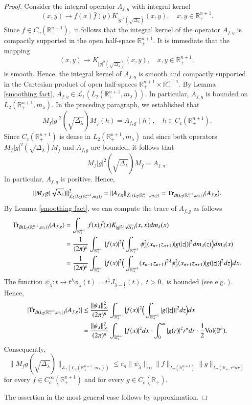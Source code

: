 \documentclass[12pt]{amsart}
\begin{document}
\begin{proof}
{Consider the integral operator $A_{f,g}$ with integral kernel
$$(x,y)\to f(x)\bar{f}(y)K_{|g|^2(\sqrt{\Delta_{\lambda}})}(x,y),\quad x,y\in\mathbb{R}^{n+1}_+.$$
Since $f\in C_c(\mathbb{R}^{n+1}_+),$ it follows that the integral kernel of the operator $A_{f,g}$ is compactly supported in the open half-space $\mathbb{R}^{n+1}_+.$ It is immediate that the mapping
$$(x,y)\to K_{|g|^2(\sqrt{\Delta_{\lambda}})}(x,y),\quad x,y\in\mathbb{R}^{n+1}_+,$$
is smooth. Hence, the integral kernel of $A_{f,g}$ is smooth and compactly supported in the Cartesian product of open half-spaces $\mathbb{R}^{n+1}_+\times\mathbb{R}^{n+1}_+.$ By Lemma \ref{smoothing fact}, $A_{f,g}\in\mathcal{L}_1(L_2(\mathbb{R}^{n+1}_+,m_{\lambda})).$ In particular, $A_{f,g}$ is bounded on $L_2(\mathbb{R}^{n+1}_+,m_{\lambda}).$ In the preceding paragraph, we established that
$$M_f|g|^2(\sqrt{\Delta_{\lambda}})M_{\bar{f}}(h)=A_{f,g}(h),\quad h\in C_c(\mathbb{R}_+^{n+1}).$$
Since $C_c(\mathbb{R}_+^{n+1})$ is dense in $L_2(\mathbb{R}^{n+1}_+,m_{\lambda})$ and since both operators $M_f|g|^2(\sqrt{\Delta_{\lambda}})M_{\bar{f}}$ and $A_{f,g}$ are bounded, it follows that
$$M_f|g|^2(\sqrt{\Delta_{\lambda}})M_{\bar{f}}=A_{f,g}.$$
In particular, $A_{f,g}$ is positive. Hence,
$$\|M_fg(\sqrt{\Delta_{\lambda}})\|_{\mathcal{L}_2(L_2(\mathbb{R}_+^{n+1},m_{\lambda}))}^2=\|A_{f,g}\|_{\mathcal{L}_1(L_2(\mathbb{R}_+^{n+1},m_{\lambda}))}={\rm Tr}_{B(L_2(\mathbb{R}^{n+1}_+,m_{\lambda}))}(A_{f,g}).$$
By Lemma \ref{smoothing fact}, we can compute the trace of $A_{f,g}$ as follows
\begin{align*}
{\rm Tr}_{B(L_2(\mathbb{R}^{n+1}_+,m_{\lambda}))}(A_{f,g})&=\int_{\mathbb{R}_+^{n+1}}f(x)\bar{f}(x)K_{|g|^2(\sqrt{\Delta_{\lambda}})}(x,x)dm_{\lambda}(x)\\
&=\frac{1}{(2\pi)^n}\int_{\mathbb{R}_+^{n+1}}|f(x)|^2\Big(\int_{\mathbb{R}_+^{n+1}}\phi_{\lambda}^2(x_{n+1}z_{n+1})|g(|z|)|^2dm_{\lambda}(z)\Big)dm_{\lambda}(x)\\
&=\frac{1}{(2\pi)^n}\int_{\mathbb{R}_+^{n+1}}|f(x)|^2\Big(\int_{\mathbb{R}_+^{n+1}}(x_{n+1}z_{n+1})^{2\lambda}\phi_{\lambda}^2(x_{n+1}z_{n+1})|g(|z|)|^2dz\Big)dx.
\end{align*}
The function $\psi_{\lambda}:t\to t^{\lambda}\phi_{\lambda}(t)=t^{\frac12}J_{\lambda-\frac12}(t),$ $t>0,$ is bounded (see e.g. \cite[p.364]{MR167642}). Hence,
\begin{align*}
|{\rm Tr}_{B(L_2(\mathbb{R}^{n+1}_+,m_{\lambda}))}(A_{f,g})|&\leq\frac{\|\psi_{\lambda}\|_{\infty}^2}{(2\pi)^n}\int_{\mathbb{R}_+^{n+1}}|f(x)|^2\Big(\int_{\mathbb{R}_+^{n+1}}|g(|z|)|^2dz\Big)dx\\
&=\frac{\|\psi_{\lambda}\|_{\infty}^2}{(2\pi)^n}\int_{\mathbb{R}_+^{n+1}}|f(x)|^2dx\cdot\int_0^{\infty}|g(r)|^2r^ndr\cdot\frac12{\rm Vol}(\mathbb{S}^n).
\end{align*}
Consequently,
$$\|M_fg(\sqrt{\Delta_{\lambda}})\|_{\mathcal{L}_2(L_2(\mathbb{R}_+^{n+1},m_{\lambda}))}\leq c_n\|\psi_{\lambda}\|_{\infty}\|f\|_{L_2(\mathbb{R}_+^{n+1})}\|g\|_{L_2(\mathbb{R}_+,r^ndr)}$$
for every $f\in C_c^{\infty}(\mathbb{R}^{n+1}_+)$ and for every $g\in C_c(\mathbb{R}_+).$

The assertion in the most general case follows by approximation.}
\end{proof}
\end{document}
